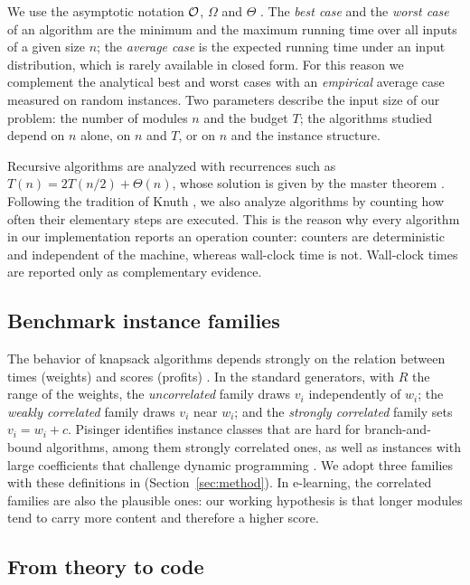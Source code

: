 We use the asymptotic notation $\mathcal{O}$, $\Omega$ and $\Theta$ \cite{cormen2022}. The \emph{best case} and the \emph{worst case} of an algorithm are the minimum and the maximum running time over all inputs of a given size $n$; the \emph{average case} is the expected running time under an input distribution, which is rarely available in closed form. For this reason we complement the analytical best and worst cases with an \emph{empirical} average case measured on random instances. Two parameters describe the input size of our problem: the number of modules $n$ and the budget $T$; the algorithms studied depend on $n$ alone, on $n$ and $T$, or on $n$ and the instance structure.

Recursive algorithms are analyzed with recurrences such as $T(n)=2T(n/2)+\Theta(n)$, whose solution is given by the master theorem \cite{cormen2022}. Following the tradition of Knuth \cite{knuth1998}, we also analyze algorithms by counting how often their elementary steps are executed. This is the reason why every algorithm in our implementation reports an operation counter: counters are deterministic and independent of the machine, whereas wall-clock time is not. Wall-clock times are reported only as complementary evidence.

\subsection{Benchmark instance families}

The behavior of knapsack algorithms depends strongly on the relation between times (weights) and scores (profits) \cite{pisinger2005,kellerer2004}. In the standard generators, with $R$ the range of the weights, the \emph{uncorrelated} family draws $v_i$ independently of $w_i$; the \emph{weakly correlated} family draws $v_i$ near $w_i$; and the \emph{strongly correlated} family sets $v_i = w_i + c$. Pisinger identifies instance classes that are hard for branch-and-bound algorithms, among them strongly correlated ones, as well as instances with large coefficients that challenge dynamic programming \cite{pisinger2005}. We adopt three families with these definitions in  (Section~\ref{sec:method}). In e-learning, the correlated families are also the plausible ones: our working hypothesis is that longer modules tend to carry more content and therefore a higher score.

\subsection{From theory to code}

